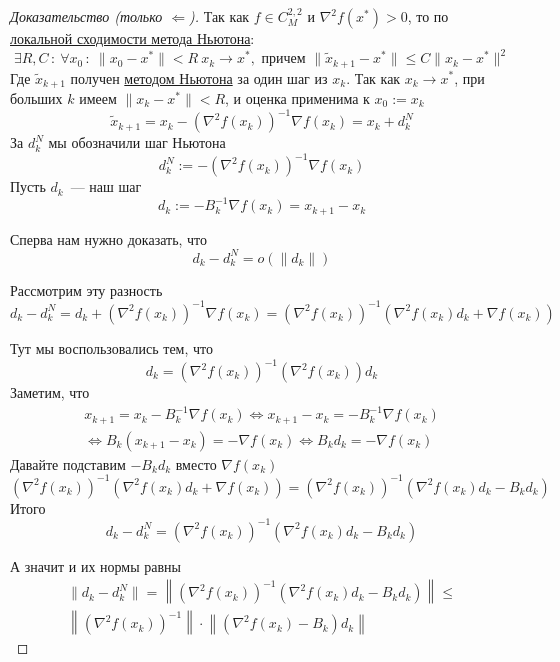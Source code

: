 \begin{proof}[Доказательство (только $\Leftarrow$)]
  Так как $f \in C^{2,2}_M$ и $\nabla^2 f(x^{*}) > 0$, то по \hyperref[note:CDA139F9-5438-41E1-96B1-11A751BE40C5]{локальной сходимости метода Ньютона}:
  \[
  \exists R,C\,:\ \forall x_0\,:\  \|x_0-x^{*}\| < R\ x_k \rightarrow x^*,\text{ причем }
  \|\tilde{x}_{k+1} - x^{*}\| \le C\|x_k - x^{*}\|^{2}
  \]
  Где $\tilde{x}_{k+1}$ получен \hyperref[note:C0ED5501-CFC6-42BA-A53A-1B346CBA545D]{методом Ньютона} за один шаг из $x_k$. Так как $x_k \rightarrow x^{*}$, при больших $k$ имеем $\|x_k - x^{*}\| < R$, и оценка применима к $x_0 := x_k$
  \[
  \tilde{x}_{k+1} = x_k - \left( \nabla^2 f(x_k) \right)^{-1} \nabla f(x_k) = x_k + d_k^N
  \]
  За $d_{k}^N$  мы обозначили шаг Ньютона
  \[
  d_k^N := - \left( \nabla^2 f(x_k) \right)^{-1} \nabla f(x_k)
  \]
  Пусть  $d_k$~--- наш шаг
  \[
  d_k := - B^{-1}_k \nabla f(x_k) = x_{k+1} - x_k
  \]

  Сперва нам нужно доказать, что
  \[
  d_k - d_k^N = o(\|d_k\|)
  \]

  Рассмотрим эту разность
  \[
  d_k - d_k^N = d_k + \left( \nabla^2 f(x_k)\right)^{-1} \nabla f(x_k)
  = \left( \nabla^2 f(x_k)\right)^{-1} \left( \nabla^2 f(x_k) d_k + \nabla f(x_k) \right)
  \]

  Тут мы воспользовались тем, что
  \[
  d_k = \left( \nabla^2f(x_k) \right)^{-1} \left( \nabla^2 f(x_k) \right) d_k
  \]
  Заметим, что
  \begin{multline*}
  x_{k+1} = x_k -B_k^{-1}\nabla f(x_k) \Leftrightarrow x_{k+1} - x_k = -B_k^{-1}\nabla f(x_k) \\
  \Leftrightarrow B_k(x_{k+1} -x_k ) = - \nabla f(x_k) \Leftrightarrow B_kd_k = - \nabla f(x_k)
  \end{multline*}
  Давайте подставим $-B_kd_k$ вместо $\nabla f(x_k)$
  \[
  \left( \nabla^2 f(x_k)\right)^{-1} \left( \nabla^2 f(x_k) d_k + \nabla f(x_k) \right)
  = \left( \nabla^2 f(x_k)\right)^{-1} \left( \nabla^2 f(x_k) d_k - B_kd_k \right)
  \]
  Итого
  \[
  d_k - d_k^N
  = \left( \nabla^2 f(x_k)\right)^{-1} \left( \nabla^2 f(x_k) d_k - B_kd_k \right)
  \]

  А значит и их нормы равны
  \begin{multline*}
  \| d_k - d_k^N\| =
  \left\| \left( \nabla^2 f(x_k)\right)^{-1} \left( \nabla^2 f(x_k) d_k - B_kd_k \right) \right\|
  \le\\ \left\|\left(\nabla^2 f(x_k)\right)^{-1} \right\|  \cdot
  \left\| \left( \nabla^2 f(x_k) - B_k \right) d_k\right\|
  \end{multline*}


\end{proof}
